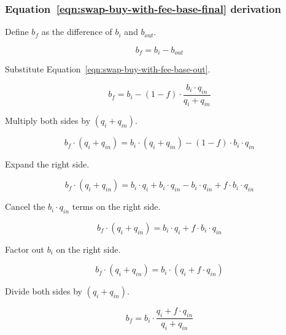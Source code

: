 \subsubsection{Equation~\ref{eqn:swap-buy-with-fee-base-final} derivation}%
\label{sssec:equation-eqn-swap-buy-with-fee-base-final-derivation}

Define $b_f$ as the difference of $b_i$ and $b_{out}$.

\begin{equation}
	b_f = b_i - b_{out} \nonumber
\end{equation}

Substitute Equation~\ref{eqn:swap-buy-with-fee-base-out}.

\begin{equation}
	b_f = b_i - (1 - f) \cdot \frac{b_i \cdot q_{in}}{q_i + q_{in}} \nonumber
\end{equation}

Multiply both sides by $(q_i + q_{in})$.

\begin{equation}
	b_f \cdot (q_i + q_{in}) =
	b_i \cdot (q_i + q_{in}) - (1 - f) \cdot b_i \cdot q_{in} \nonumber
\end{equation}

Expand the right side.

\begin{equation}
	b_f \cdot (q_i + q_{in}) = b_i \cdot q_i + b_i \cdot q_{in} - b_i \cdot q_{in} +
	f \cdot b_i \cdot q_{in} \nonumber
\end{equation}

Cancel the $b_i \cdot q_{in}$ terms on the right side.

\begin{equation}
	b_f \cdot (q_i + q_{in}) = b_i \cdot q_i + f \cdot b_i \cdot q_{in} \nonumber
\end{equation}

Factor out $b_i$ on the right side.

\begin{equation}
	b_f \cdot (q_i + q_{in}) = b_i \cdot (q_i + f \cdot q_{in}) \nonumber
\end{equation}

Divide both sides by $(q_i + q_{in})$.

\begin{equation}
	b_f = b_i \cdot \frac{q_i + f \cdot q_{in}}{q_i + q_{in}} \nonumber
\end{equation}
